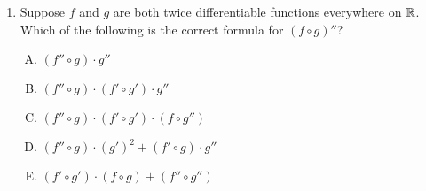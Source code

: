 \documentclass[10pt]{amsart}
\begin{document}
\begin{enumerate}
  {\em Answer}: Option (C)

  {\em Explanation}: We differentiate once to get:

  $$(f \cdot g)' = f' \cdot g + f \cdot g'$$

  Now we differentiate both sides. The left side becomes $(f \cdot
  g)''$. The right side is a sum of two terms, so we get:

  $$(f \cdot g)'' = (f' \cdot g)' + (f \cdot g')'$$

  We now apply the product rule to each piece on the right side to get:

  $$(f \cdot g)'' = [f'' \cdot g + f' \cdot g'] + [f' \cdot g' + f \cdot g'']$$

  Combining terms, we get option (C).

  {\em Remark}: In general, there is a binomial theorem-like formula
  for the $n^{th}$ derivative of $f \cdot g$. I've given the formula
  below, but it will make sense only to people who have seen summation
  notation and the binomial coefficients, which we have not yet done:

  $$(f \cdot g)^{(n)} = \sum_{k=0}^n \binom{n}{k} f^{(k)}g^{(n - k)}$$

  This is a lot like the binomial theorem expansion for $(a +
  b)^n$. It can be proved purely formally using induction from the
  product rule.\footnote{One of the things I'm doing research on has
  to do with the fact above, albeit with a completely different notion
  of differentiation.}

  {\em Performance review}: Everybody got this correct

  {\em Historical note (last year)}: $13$ out of $14$ people got this
  correct. $1$ person chose option (E), though that person's rough work
  gave option (C).
\item Suppose $f$ and $g$ are both twice differentiable functions
  everywhere on $\mathbb{R}$. Which of the following is the correct formula
  for $(f \circ g)''$?

  \begin{enumerate}[(A)]

  \item $(f'' \circ g) \cdot g''$
  \item $(f'' \circ g) \cdot (f' \circ g') \cdot g''$
  \item $(f'' \circ g) \cdot (f' \circ g') \cdot (f \circ g'')$
  \item $(f'' \circ g) \cdot (g')^2 + (f' \circ g) \cdot g''$
  \item $(f' \circ g') \cdot (f \circ g) + (f'' \circ g'')$
  \end{enumerate}


\end{enumerate}
\end{document}
